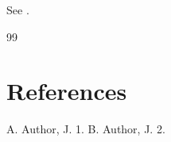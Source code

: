 \documentclass{article}
\begin{document}
See \cite{a,b}.
\begin{thebibliography}{99}
\label{refs}
\section*{References}
 A. Author, J. 1.
 B. Author, J. 2.
\end{thebibliography}
\end{document}

